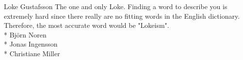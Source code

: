 \documentclass[main.tex]{subfiles}
\begin{document}
Loke Gustafsson 
\newline
The one and only Loke. Finding a word to describe you is extremely hard since there really are no fitting words in the English dictionary. Therefore, the most accurate word would be "Lokeism".
\newline
\\*
Björn Noren
\newline
\\*
Jonas Ingensson
\newline
\\*
Christiane Miller
\end{document}
